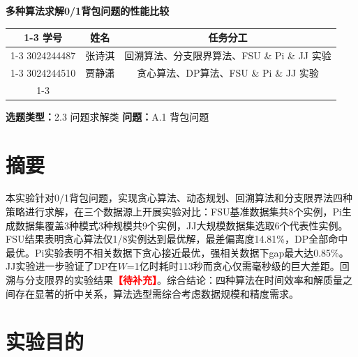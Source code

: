 \documentclass[6pt,a4paper]{ctexart}
\newcommand{\tb}{\textcolor{red}{\textbf{【待补充】}}}
\begin{document}
\fontsize{9pt}{10pt}\selectfont


\vspace*{1.0cm}

\begin{center}
  {\Large \textbf{多种算法求解0/1背包问题的性能比较}}
\end{center}

\vspace{0.6cm}

\begin{center}
\begin{tabular}{ccc}
\cline{1-3}
学号 & 姓名 & 任务分工 \\
\cline{1-3}
3024244487 & 张诗淇 & 回溯算法、分支限界算法、FSU \& Pi \& JJ 实验 \\
\cline{1-3}
3024244510 & 贾静潇 & 贪心算法、DP算法、FSU \& Pi \& JJ 实验 \\
\cline{1-3}
\end{tabular}
\end{center}

\vspace{0.4cm}

\begin{center}
  \textbf{选题类型：}2.3 问题求解类 \quad \textbf{问题：}A.1 背包问题
\end{center}

\vspace{0.6cm}


\section{摘要}

本实验针对0/1背包问题，实现贪心算法、动态规划、回溯算法和分支限界法四种策略进行求解，在三个数据源上开展实验对比：FSU基准数据集共8个实例，Pi生成数据集覆盖3种模式3种规模共9个实例，JJ大规模数据集选取6个代表性实例。FSU结果表明贪心算法仅1/8实例达到最优解，最差偏离度14.81\%，DP全部命中最优。Pi实验表明不相关数据下贪心接近最优，强相关数据下gap最大达0.85\%。JJ实验进一步验证了DP在$W$=1亿时耗时113秒而贪心仅需毫秒级的巨大差距。回溯与分支限界的实验结果\tb。综合结论：四种算法在时间效率和解质量之间存在显著的折中关系，算法选型需综合考虑数据规模和精度需求。


\section{实验目的}
\end{document}

